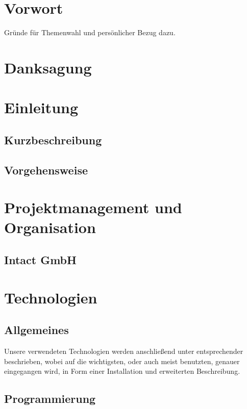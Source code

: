 \documentclass[12pt]{scrartcl}
\begin{document}
\section*{Vorwort}
\label{sec:vorwort}
Gründe für Themenwahl und persönlicher Bezug dazu.

\newpage
	\tableofcontents
\newpage

\section*{Danksagung}
\label{sec:danksagung}


\section{Einleitung}
\label{sec:einleitung}
\subsection{Kurzbeschreibung}
\label{sec:kurzbeschreibung}
\subsection{Vorgehensweise}
\label{sec:vorgehensweise}

\section{Projektmanagement und Organisation}
\label{sec:projektmanagement-und-organisation}
\subsection{Intact GmbH}
\label{sec:intact-gmbh}

\section{Technologien}
\subsection{Allgemeines}
Unsere verwendeten Technologien werden anschließend unter entsprechender beschrieben, wobei auf die wichtigsten, oder auch meist benutzten, genauer eingegangen wird, in Form einer Installation und erweiterten Beschreibung.
\subsection{Programmierung}
\end{document}
